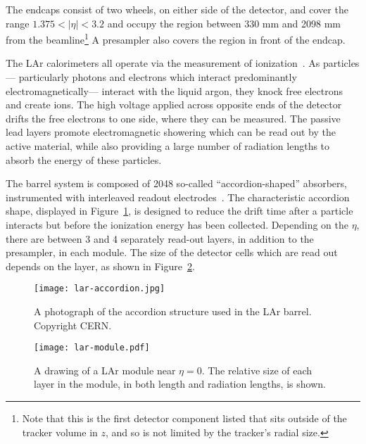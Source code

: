 The endcaps consist of two wheels, on either side of the detector, and cover the range $1.375 < |\eta| < 3.2$ and occupy the region between 330 mm and 2098 mm from the beamline\footnote{Note that this is the first detector component listed that sits outside of the tracker volume in $z$, and so is not limited by the tracker's radial size.} A presampler also covers the region in front of the endcap.

The LAr calorimeters all operate via the measurement of ionization~\cite{Detectors,Wigmans}. As particles--- particularly photons and electrons which interact predominantly electromagnetically--- interact with the liquid argon, they knock free electrons and create ions. The high voltage applied across opposite ends of the detector drifts the free electrons to one side, where they can be measured. The passive lead layers promote electromagnetic showering which can be read out by the active material, while also providing a large number of radiation lengths to absorb the energy of these particles.

The barrel system is composed of 2048 so-called ``accordion-shaped'' absorbers, instrumented with interleaved readout electrodes~\cite{ATLASPaper}. The characteristic accordion shape, displayed in Figure~\ref{fig:detector:lar-accordion}, is designed to reduce the drift time after a particle interacts but before the ionization energy has been collected. Depending on the $\eta$, there are between 3 and 4 separately read-out layers, in addition to the presampler, in each module. The size of the detector cells which are read out depends on the layer, as shown in Figure~\ref{fig:detector:lar-module}. 


\begin{figure}
\centering
\texttt{[image: lar-accordion.jpg]}
\caption{A photograph of the accordion structure used in the LAr barrel. Copyright CERN.}
\label{fig:detector:lar-accordion}
\end{figure}



\begin{figure}
\centering
\texttt{[image: lar-module.pdf]}
\caption{A drawing of a LAr module near $\eta = 0$. The relative size of each layer in the module, in both length and radiation lengths, is shown.}
\label{fig:detector:lar-module}
\end{figure}

